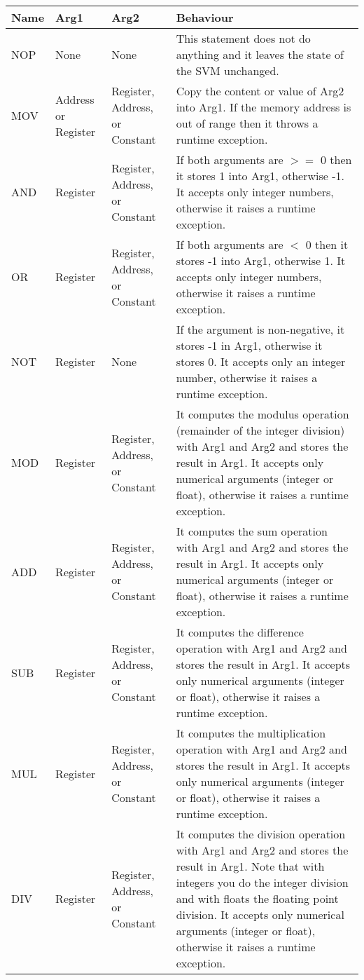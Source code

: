 \begin{longtable}{|p{1cm}|p{2cm}|p{2cm}|p{5cm}|}
	\hline
	\textbf{Name} & \textbf{Arg1} & \textbf{Arg2} & \textbf{Behaviour} \\
	\hline
	NOP & None & None & This statement does not do anything and it leaves the state of the SVM unchanged. \\
	\hline
	MOV & Address or Register & Register, Address, or Constant & Copy the content or value of Arg2 into Arg1. If the memory address is out of range then it throws a runtime exception. \\
	\hline
	AND & Register & Register, Address, or Constant & If both arguments are $>=$ 0 then it stores 1 into Arg1, otherwise -1. It accepts only integer numbers, otherwise it raises a runtime exception. \\
	\hline
	OR & Register & Register, Address, or Constant & If both arguments are $<$ 0 then it stores -1 into Arg1, otherwise 1. It accepts only integer numbers, otherwise it raises a runtime exception. \\
	\hline
	NOT & Register & None & If the argument is non-negative, it stores -1 in Arg1, otherwise it stores 0. It accepts only an integer number, otherwise it raises a runtime exception. \\
	\hline
	MOD & Register & Register, Address, or Constant & It computes the modulus operation (remainder of the integer division) with Arg1 and Arg2 and stores the result in Arg1. It accepts only numerical arguments (integer or float), otherwise it raises a runtime exception. \\
	\hline
	ADD & Register & Register, Address, or Constant & It computes the sum operation with Arg1 and Arg2 and stores the result in Arg1. It accepts only numerical arguments (integer or float), otherwise it raises a runtime exception. \\
	\hline
	SUB & Register & Register, Address, or Constant & It computes the difference operation with Arg1 and Arg2 and stores the result in Arg1. It accepts only numerical arguments (integer or float), otherwise it raises a runtime exception. \\
	\hline
	MUL & Register & Register, Address, or Constant & It computes the multiplication operation with Arg1 and Arg2 and stores the result in Arg1. It accepts only numerical arguments (integer or float), otherwise it raises a runtime exception. \\
	\hline
	DIV & Register & Register, Address, or Constant & It computes the division operation with Arg1 and Arg2 and stores the result in Arg1. Note that with integers you do the integer division and with floats the floating point division. It accepts only numerical arguments (integer or float), otherwise it raises a runtime exception. \\

\end{longtable}
